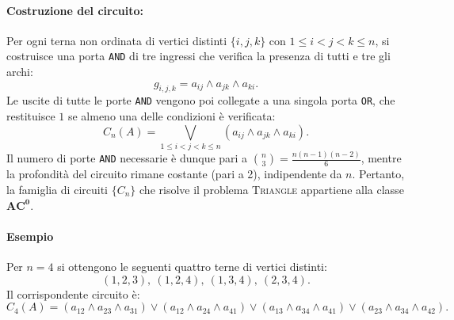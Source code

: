 \documentclass[a4paper,12pt]{report}
\theoremstyle{propositionstyle}
\begin{document}
    \paragraph{Costruzione del circuito:}
    Per ogni terna non ordinata di vertici distinti $\{i,j,k\}$ con $1 \leq i < j < k \leq n$, si costruisce una porta \texttt{AND} di tre ingressi che verifica la presenza di tutti e tre gli archi:
    \[
        g_{i,j,k} = a_{ij} \wedge a_{jk} \wedge a_{ki}.
    \]
    Le uscite di tutte le porte \texttt{AND} vengono poi collegate a una singola porta \texttt{OR}, che restituisce $1$ se almeno una delle condizioni è verificata:
    \[
        C_n(A) = \bigvee_{1 \leq i < j < k \leq n} (a_{ij} \wedge a_{jk} \wedge a_{ki}).
    \]
    Il numero di porte \texttt{AND} necessarie è dunque pari a $\binom{n}{3} = \frac{n(n-1)(n-2)}{6}$, mentre la profondità del circuito rimane costante (pari a 2), indipendente da $n$.
    Pertanto, la famiglia di circuiti $\{C_n\}$ che risolve il problema \textsc{Triangle} appartiene alla classe $\mathbf{AC^0}$.

    \paragraph{Esempio}
    Per $n = 4$ si ottengono le seguenti quattro terne di vertici distinti:
    \[
        (1,2,3),\ (1,2,4),\ (1,3,4),\ (2,3,4).
    \]
    Il corrispondente circuito è:
    \[
        C_4(A) =
        (a_{12}\wedge a_{23}\wedge a_{31})
        \vee
        (a_{12}\wedge a_{24}\wedge a_{41})
        \vee
        (a_{13}\wedge a_{34}\wedge a_{41})
        \vee
        (a_{23}\wedge a_{34}\wedge a_{42}).
    \]
\end{document}
